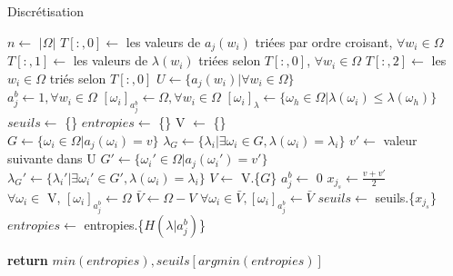\documentclass[a4paper]{article}
\begin{document}
\begin{algorithm}[H]
\caption{Discrétisation}
\label{alg:discretize}
\begin{algorithmic}
\State {}
\State {}
\State {}

\State $n\gets$ $| \Omega |$
\State $T[:,0]\gets$ les valeurs de $a_j(w_i)$ triées par ordre croisant, $\forall w_i \in \Omega$
\State $T[:,1]\gets$ les valeurs de $\lambda(w_i)$ triées selon $T[:,0]$, $\forall w_i \in \Omega$
\State $T[:,2]\gets$ les $w_i \in \Omega$ triés selon $T[:,0]$
\State $U\gets \{a_j(w_i) | \forall w_i \in \Omega\}$  \\

\State $a^{b}_j\gets 1, \forall w_i \in \Omega$ 
\State $[\omega_i]_{a^{b}_j} \gets \Omega, \forall w_i \in \Omega$ 
\State $[\omega_i]_{\lambda} \gets \{\omega_h \in \Omega | \lambda(\omega_i) \leq \lambda(\omega_h)\}$ \\

\State $seuils\gets$ \{\}
\State $entropies\gets$ \{\}
\State V $\gets$ \{\}  \\

	\State $G \gets \{\omega_i \in \Omega | a_j(\omega_i) = v\}$
	\State $\lambda_G \gets \{\lambda_i | \exists \omega_i \in G, \lambda(\omega_i) = \lambda_i\}$
    \State $v' \gets$ valeur suivante dans U
	\State $G' \gets \{\omega_i' \in \Omega | a_j(\omega_i') = v'\}$
    \State $\lambda_G' \gets \{\lambda_i' | \exists \omega_i' \in G', \lambda(\omega_i) = \lambda_i\}$
    \State $V \gets$ V.\{$G$\}    
    \State $a^{b}_j\gets$ 0 
    \State $x_{j_s}\gets \frac{v + v'}{2}$\\
    
    	\State $\forall \omega_i \in$ V, $[\omega_i]_{a^{b}_j} \gets \Omega$
        \State $\bar{V} \gets \Omega - V$ 
        \State $\forall \omega_i \in \bar{V}, [\omega_i]_{a^{b}_j} \gets \bar{V}$
        \State $seuils \gets$ seuils.\{$x_{j_s}$\}
        \State $entropies \gets$ entropies.\{$H(\lambda | a^{b}_j)$\}
    \EndIf
\EndFor

\State \textbf{return} $min(entropies), seuils[argmin(entropies)]$

\EndProcedure
\end{algorithmic}
\end{algorithm}
\end{document}
